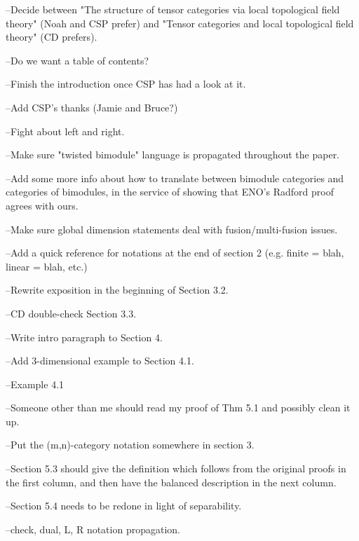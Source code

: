 --Decide between "The structure of tensor categories via local topological field theory" (Noah and CSP prefer) and "Tensor categories and local topological field theory" (CD prefers).

--Do we want a table of contents?

--Finish the introduction once CSP has had a look at it.

--Add CSP's thanks (Jamie and Bruce?)

--Fight about left and right.

--Make sure "twisted bimodule" language is propagated throughout the paper.

--Add some more info about how to translate between bimodule categories and categories of bimodules, in the service of showing that ENO's Radford proof agrees with ours.

--Make sure global dimension statements deal with fusion/multi-fusion issues.

--Add a quick reference for notations at the end of section 2 (e.g. finite = blah, linear = blah, etc.)

--Rewrite exposition in the beginning of Section 3.2.

--CD double-check Section 3.3.

--Write intro paragraph to Section 4.

--Add 3-dimensional example to Section 4.1.

--Example 4.1

--Someone other than me should read my proof of Thm 5.1 and possibly clean it up.

--Put the (m,n)-category notation somewhere in section 3.

--Section 5.3 should give the definition which follows from the original proofs in the first column, and then have the balanced description in the next column.

--Section 5.4 needs to be redone in light of separability.

--check, dual, L, R notation propagation.